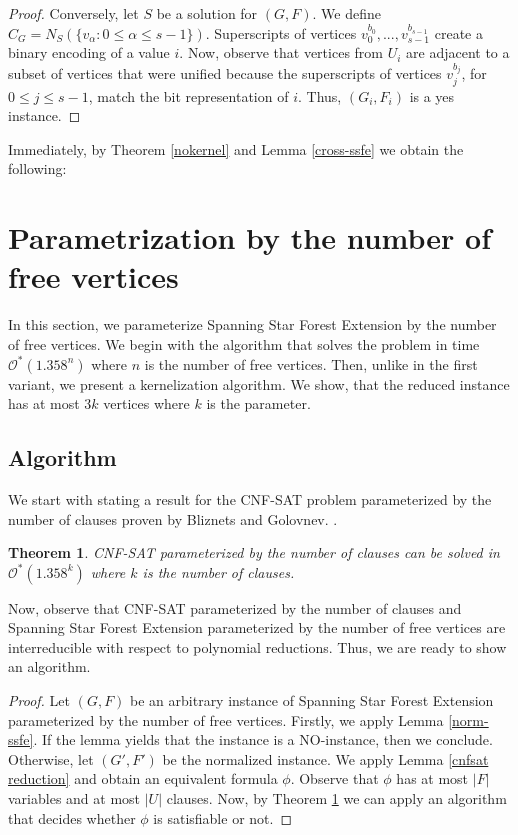 \documentclass[en]{pracamgr}
\newtheorem{theorem}{Theorem}
\theoremstyle{definition}
\newcommand{\ssfep}{{\sc Spanning Star Forest Extension}}
\newcommand{\cnfsat}{{\sc CNF-SAT}}
\begin{document}
\begin{proof}
	Conversely, let $S$ be a solution for $(G,F)$. We define $C_G = N_S(\{v_\alpha: 0 \leq \alpha \leq s-1\})$. Superscripts of vertices $v^{b_0}_0,...,v^{b_{s-1}}_{s-1}$ create a binary encoding of a value $i$. Now, observe that vertices from $U_i$ are adjacent to a subset of vertices that were unified because the superscripts of vertices $v^{b_j}_j$, for $0 \leq j \leq s-1$, match the bit representation of $i$. Thus, $(G_i,F_i)$ is a yes instance.
	
\end{proof}

Immediately, by Theorem \ref{nokernel} and Lemma \ref{cross-ssfe} we obtain the following:

\thmssfepnokernel*

\section{Parametrization by the number of free vertices}

In this section, we parameterize  \ssfep{} by the number of free vertices. We begin with the algorithm that solves the problem in time $\mathcal{O}^*(1.358^n)$ where $n$ is the number of free vertices. Then, unlike in the first variant, we present a kernelization algorithm. We show, that the reduced instance has at most $3k$ vertices where $k$ is the parameter.

\subsection{Algorithm}
We start with stating a result for the \cnfsat{} problem parameterized by the number of clauses proven by Bliznets and Golovnev. \cite{MAXSAT}.

\begin{theorem}\label{cnfsatmtime}
	\cnfsat{} parameterized by the number of clauses can be solved in $\mathcal{O}^*(1.358^k)$ where $k$ is the number of clauses.
\end{theorem}

Now, observe that \cnfsat{} parameterized by the number of clauses and \ssfep{} parameterized by the number of free vertices are interreducible with respect to polynomial reductions. Thus, we are ready to show an algorithm.

\thmssfepfreealg*

\begin{proof}
	Let $(G,F)$ be an arbitrary instance of \ssfep{} parameterized by the number of free vertices. Firstly, we apply Lemma \ref{norm-ssfe}. If the lemma yields that the instance is a NO-instance, then we conclude. Otherwise, let $(G',F')$ be the normalized instance. We apply Lemma \ref{cnfsat reduction} and obtain an equivalent formula $\phi$. Observe that $\phi$ has at most $|F|$ variables and at most $|U|$ clauses. Now, by Theorem \ref{cnfsatmtime} we can apply an algorithm that decides whether $\phi$ is satisfiable or not.
\end{proof}
\end{document}
